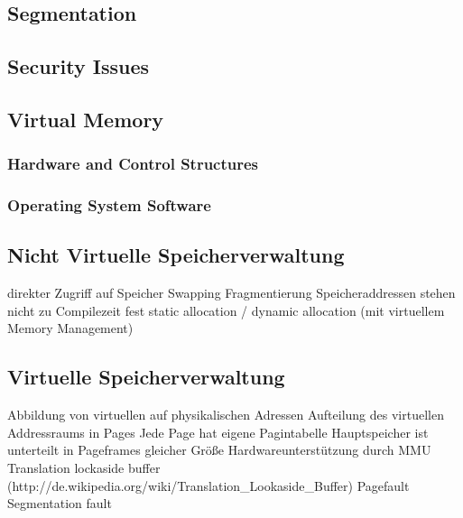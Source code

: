\subsection{Segmentation}

\subsection{Security Issues}

\subsection{Virtual Memory}
\subsubsection{Hardware and Control Structures}
\subsubsection{Operating System Software}

\subsection*{Nicht Virtuelle Speicherverwaltung}

        direkter Zugriff auf Speicher
        Swapping
        Fragmentierung
        Speicheraddressen stehen nicht zu Compilezeit fest
        static allocation / dynamic allocation
     (mit virtuellem Memory Management)



\subsection*{Virtuelle Speicherverwaltung}

        Abbildung von virtuellen auf physikalischen Adressen
        Aufteilung des virtuellen Addressraums in Pages
        Jede Page hat eigene Pagintabelle
        Hauptspeicher ist unterteilt in Pageframes gleicher Größe
        Hardwareunterstützung durch MMU
        Translation lockaside buffer (http://de.wikipedia.org/wiki/Translation\_Lookaside\_Buffer)
        Pagefault
        Segmentation fault



